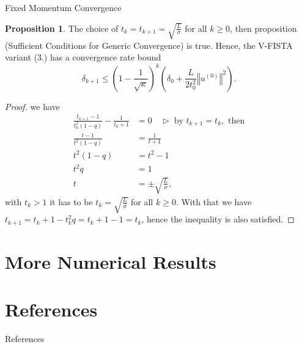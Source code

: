 \documentclass[11pt]{beamer}
\theoremstyle{definition}
\newtheorem{prop}{Proposition}[section]
\begin{document}
    \begin{frame}{Fixed Momentum Convergence}
        \begin{prop}
            The choice of $t_k = t_{k + 1} = \sqrt{\frac{L}{\sigma}}$ for all $k \ge 0$, then proposition (Sufficient Conditions for Generic Convergence) is true. 
            Hence, the V-FISTA variant (3.) has a convergence rate bound 
            \[
                \delta_{k + 1}
                \le 
                \left(
                    1 - \frac{1}{\sqrt{\kappa}}
                \right)^k\left(
                    \delta_0 + \frac{L}{2t_0^2}\left\Vert
                        u^{(0)}
                    \right\Vert^2
                \right).        
            \]
        \end{prop}
    \end{frame}
    \begin{frame}
        \begin{proof}
            we have 
            \begin{align*}
                \frac{t_{k + 1} - 1}{t^2_k(1 - q)}
                    -
                \frac{1}{t_k + 1} &= 0
                \quad 
                \triangleright\; \text{by } t_{k + 1} = t_k, \text{ then}
                \\
                \frac{t - 1}{t^2(1 - q)} &= \frac{1}{t + 1}
                \\
                t^2(1 - q) 
                &= t^2 - 1
                \\
                t^2q &= 1
                \\
                t &= \pm \sqrt{\frac{L}{\sigma}}, 
            \end{align*}
            with $t_k > 1$ it has to be $t_k = \sqrt{\frac{L}{\sigma}}$ for all $k \ge 0$. 
            With that we have $t_{k + 1} = t_{k} + 1 - t_k^2 q = t_k + 1 - 1 = t_k$, hence the inequality is also satisfied. 
        \end{proof}
        
        
    \end{frame}



\section{More Numerical Results}

    
\section{References}
    \begin{frame}[allowframebreaks]{References}
        
        
    \end{frame}
\end{document}
